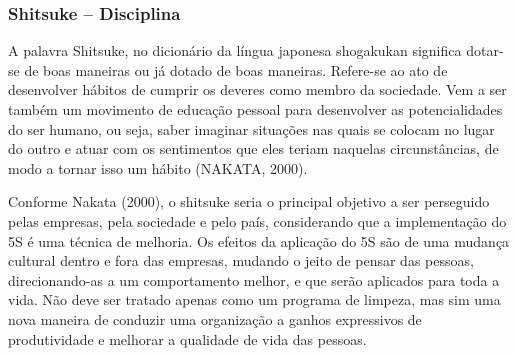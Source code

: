 \documentclass[
]{article}
\begin{document}
\hypertarget{shitsuke-disciplina}{%
\subsubsection{Shitsuke -- Disciplina}\label{shitsuke-disciplina}}

A palavra Shitsuke, no dicionário da língua japonesa shogakukan significa dotar-se de boas maneiras ou já dotado de boas maneiras. Refere-se ao ato de desenvolver hábitos de cumprir os deveres como membro da sociedade. Vem a ser também um movimento de educação pessoal para desenvolver as potencialidades do ser humano, ou seja, saber imaginar situações nas quais se colocam no lugar do outro e atuar com os sentimentos que eles teriam naquelas circunstâncias, de modo a tornar isso um hábito (NAKATA, 2000).

Conforme Nakata (2000), o shitsuke seria o principal objetivo a ser perseguido pelas empresas, pela sociedade e pelo país, considerando que a implementação do 5S é uma técnica de melhoria. Os efeitos da aplicação do 5S são de uma mudança cultural dentro e fora das empresas, mudando o jeito de pensar das pessoas, direcionando-as a um comportamento melhor, e que serão aplicados para toda a vida. Não deve ser tratado apenas como um programa de limpeza, mas sim uma nova maneira de conduzir uma organização a ganhos expressivos de produtividade e melhorar a qualidade de vida das pessoas.
\end{document}
